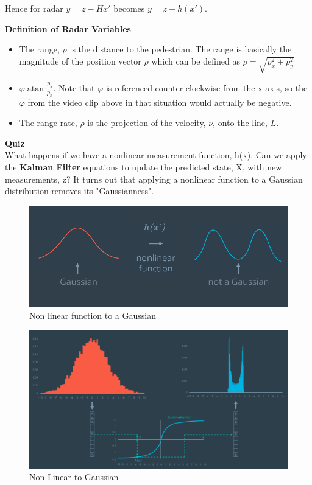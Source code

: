 \documentclass[11pt, a4paper]{article}
\begin{document}
Hence for radar $y = z - Hx'$ becomes $y = z - h(x')$.



\textbf{Definition of Radar Variables} \\

\begin{itemize}
	\item The range, $\rho$ is the distance to the pedestrian. The range is basically the magnitude of the position vector $\rho$ which can be defined as $\rho = \sqrt{p_{x}^2 + p_{y}^2}$
	\item $\varphi \operatorname{atan} \frac{p_y}{p_x}$. Note that $\varphi$ is referenced counter-clockwise from the x-axis, so the $\varphi$ from the video clip above in that situation would actually be negative.
	\item The range rate, $\dot{\rho}$ is the projection of the velocity, $\nu$, onto the line, $L$.
\end{itemize}




\textbf{Quiz} \\
What happens if we have a nonlinear measurement function, h(x). Can we apply the \textbf{Kalman Filter} equations to update the predicted state, X, with new measurements, z?
It turns out that applying a nonlinear function to a Gaussian distribution removes its "Gaussianness". 

\begin{figure}[htpb!]
	\centering
	\includegraphics[width=0.8\linewidth]{not_Gaussian}
	\caption{Non linear function to a Gaussian}
	\label{fig:not_Gaussian}
\end{figure}



\begin{figure}[htpb!]
	\centering
	\includegraphics[width=0.8\linewidth]{non_linear_to_gaussian}
	\caption{Non-Linear to Gaussian}
	\label{fig:non_linear_to_gaussian}
\end{figure}
\end{document}
